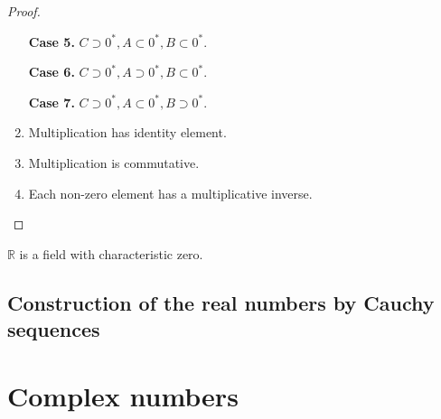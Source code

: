 \begin{proof}
\begin{enumerate}[label={(F\arabic*)}, start=4]
              \textbf{Case 5.} $C\supset {0}^{*}, A\subset {0}^{*}, B\subset {0}^{*}$.

              \textbf{Case 6.} $C\supset {0}^{*}, A\supset {0}^{*}, B\subset {0}^{*}$.

              \textbf{Case 7.} $C\supset {0}^{*}, A\subset {0}^{*}, B\supset {0}^{*}$.
        \item Multiplication has identity element.
        \item Multiplication is commutative.
        \item Each non-zero element has a multiplicative inverse.
    \end{enumerate}
\end{proof}

\begin{theorem}
    $\mathbb{R}$ is a field with characteristic zero.
\end{theorem}

\subsection{Construction of the real numbers by Cauchy sequences}

\section{Complex numbers}

